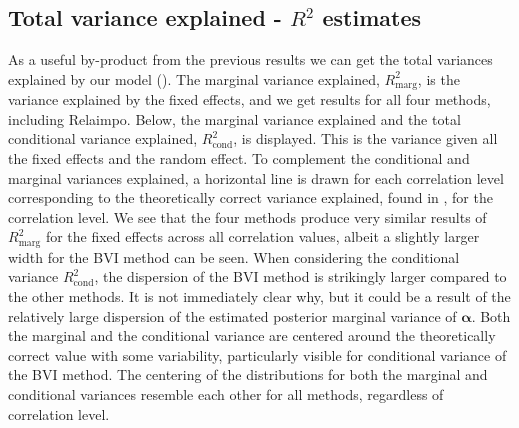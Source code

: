 \subsection{Total variance explained - $R^2$ estimates}
\label{sec:R2} 
As a useful by-product from the previous results we can get the total variances explained by our model ().
The marginal variance explained, $R^2_{\text{marg}}$, is the variance explained by the fixed effects, and we get results for all four methods, including Relaimpo.
Below, the marginal variance explained and the total conditional variance explained, $R^2_{\text{cond}}$, is displayed. 
This is the variance given all the fixed effects and the random effect.
To complement the conditional and marginal variances explained, a horizontal line is drawn for each correlation level corresponding to the theoretically correct variance explained, found in , for the correlation level. 
\newline
\newline
We see that the four methods produce very similar results of $R^2_{\text{marg}}$ for the fixed effects across all correlation values, albeit a slightly larger width for the BVI method can be seen.
When considering the conditional variance $R^2_{\text{cond}}$, the dispersion of the BVI method is strikingly larger compared to the other methods. 
It is not immediately clear why, but it could be a result of the relatively large dispersion of the estimated posterior marginal variance of $\boldsymbol{\alpha}$.
Both the marginal and the conditional variance are centered around the theoretically correct value with some variability, particularly visible for conditional variance of the BVI method. 
The centering of the distributions for both the marginal and conditional variances resemble each other for all methods, regardless of correlation level.
